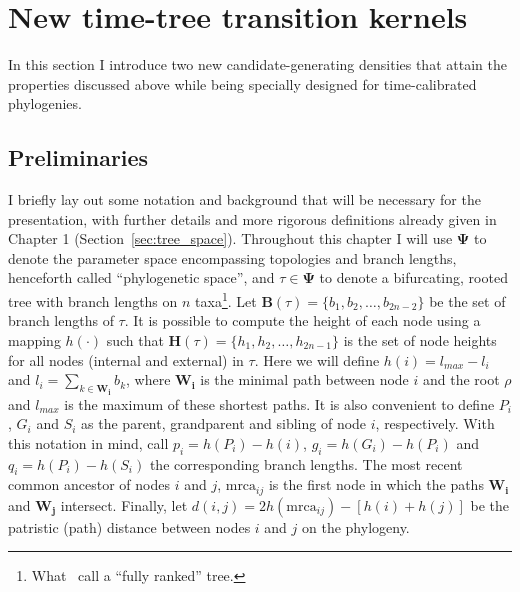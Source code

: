 
\section{New time-tree transition kernels}
\label{sec:newKernels}

In this section I introduce two new candidate-generating densities that attain the properties discussed above while being specially designed for time-calibrated phylogenies.

\subsection{Preliminaries}
\label{sec:prelim}

I briefly lay out some notation and background that will be necessary for the presentation, with further details and more rigorous definitions already given in Chapter 1 (Section~\ref{sec:tree_space}).
Throughout this  chapter I will use $\boldsymbol\Psi$ to denote the parameter space encompassing topologies and branch lengths, henceforth called ``phylogenetic space'', and $\tau \in \boldsymbol\Psi$ to denote a bifurcating, rooted tree with branch lengths on $n$ taxa\footnote{What~\cite{Drummond2015} call a ``fully ranked'' tree.}.
Let $\mathbf{B}(\tau) =\{b_1, b_2, \ldots, b_{2n-2}\}$ be the set of branch lengths of $\tau$.
It is possible to compute the height of each node using a mapping $h(\cdot)$ such that $\mathbf{H}(\tau) = \{h_1, h_2, \ldots, h_{2n-1}\}$ is the set of node heights for all nodes (internal and external) in $\tau$.
Here we will define $h(i) = l_{max} - l_i$ and $l_i = \sum_{k \in \mathbf{W_i}} b_k$, where $\mathbf{W_i}$ is the minimal path between node $i$ and the root $\rho$ and $l_{max}$ is the maximum of these shortest paths.
It is also convenient to define $P_i$, $G_i$ and $S_i$ as the parent, grandparent and sibling of node $i$, respectively.
With this notation in mind, call $p_i = h(P_i)-h(i)$, $g_i = h(G_i)-h(P_i)$ and $q_i = h(P_i)-h(S_i)$ the corresponding branch lengths.
The most recent common ancestor of nodes $i$ and $j$, $\text{mrca}_{ij}$ is the first node in which the paths $\mathbf{W_i}$ and $\mathbf{W_j}$ intersect.
Finally, let $d(i, j) = 2h(\text{mrca}_{ij}) - [ h(i)  + h(j) ]$ be the patristic (path) distance between nodes $i$ and $j$ on the phylogeny.

